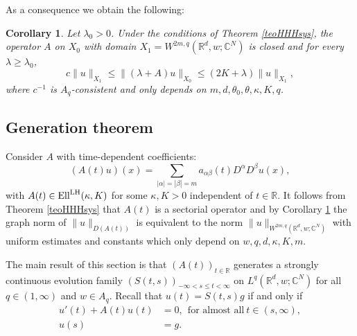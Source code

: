 \documentclass{amsart}
\theoremstyle{plain}
\theoremstyle{remark}
\theoremstyle{plain}
\newtheorem{corollary}[theorem]{Corollary}
\numberwithin{equation}{section}
\begin{document}
As a consequence we obtain the following:
\begin{corollary}\label{coro:HHHsys}
Let $\lambda_0 >0$. Under the conditions of Theorem \ref{teoHHHsys}, the operator $A$ on $X_0$ with domain $X_1 = W^{2m,q}({ \mathbb{R} }^d,w;{ \mathbb{C} }^N)$ is closed and for every $\lambda\geq\lambda_0$,
\[
c\|u\|_{X_1}\leq \|(\lambda+A)u\|_{X_0}\leq (2K+\lambda)\|u\|_{X_1},
\]
where $c^{-1}$ is $A_{q}$-consistent and only depends on $m,d,\theta_0,\theta,\kappa,K,q$.
\end{corollary}

\subsection{Generation theorem}

Consider $A$ with time-dependent coefficients:
\begin{equation}\label{eq:defoperatortimeind}
(A(t) u)(x) = \sum_{|\alpha| = |\beta|= m} a_{\alpha\beta}(t)D^{\alpha} D^\beta u(x),
\end{equation}
with $A(t)\in {\rm Ell}^{\rm LH}(\kappa,K)$ for some $\kappa, K>0$ independent of $t\in { \mathbb{R} }$.
It follows from Theorem \ref{teoHHHsys} that $A(t)$ is a sectorial operator and by Corollary \ref{coro:HHHsys} the graph norm of
$\|u\|_{D(A(t))}$ is equivalent to the norm $\|u\|_{W^{2m,q}({ \mathbb{R} }^d,w;{ \mathbb{C} }^N)}$ with uniform estimates and constants which only depend on  $w, q, d, \kappa,K,m$.

The main result of this section is that $(A(t))_{t\in { \mathbb{R} }}$ generates a strongly continuous evolution family $(S(t,s))_{-\infty<s\leq t<\infty}$ on $L^q({ \mathbb{R} }^d,w;{ \mathbb{C} }^N)$ for all $q\in (1, \infty)$ and $w\in A_q$. Recall that $u(t) = S(t,s) g$ if and only if
\begin{equation}\label{eq:Cauchyproblem}
\begin{aligned}
  u'(t) + A(t) u(t) &= 0, \ \ \text{for almost all} \ t\in (s, \infty),
  \\ u(s) &= g.
\end{aligned}
\end{equation}
\end{document}
